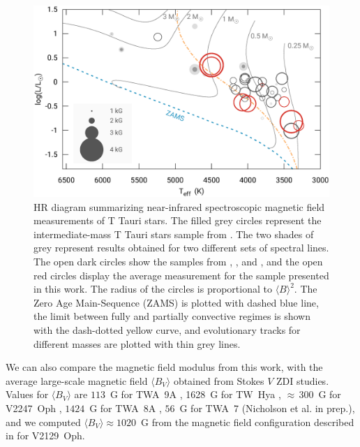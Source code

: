 \documentclass{aa}
\begin{document}
\begin{figure}
\centering
\includegraphics[width=2.0\columnwidth]{yapsi.eps}
\caption{
    HR diagram summarizing near-infrared spectroscopic magnetic field measurements of T Tauri stars. The filled grey circles represent the intermediate-mass T Tauri stars sample from \citet{2017A&A...608A..77L}. The two shades of grey represent results obtained for two different sets of spectral lines. The open dark circles show the samples from \citet{2007ApJ...664..975J}, \citet{2008AJ....136.2286Y}, and \citet{2011ApJ...729...83Y}, and the open red circles display the average measurement for the sample presented in this work. The radius of the circles is proportional to $\langle B \rangle^2$.  The Zero Age Main-Sequence (ZAMS) is plotted with dashed blue line, the limit between fully and partially convective regimes is shown with the dash-dotted yellow curve, and evolutionary tracks for different masses are plotted with thin grey lines.
}
\label{figure:yapsi}
\end{figure}

We can also compare the magnetic field modulus {\bb} from this work, with the average large-scale magnetic field $\langle B_V \rangle$ obtained from Stokes $V$ ZDI studies. Values for $\langle B_V \rangle$ are $113$~G for TWA~9A \citep{2018MNRAS.480.1754N}, 1628~G for TW~Hya \citep{2011donati-twhya}, $\approx$\,300~G for V2247~Oph \citep{2010donati-v2247oph}, $1424$~G for TWA~8A \citep{2019MNRAS.tmp..410H}, $56$~G for TWA~7 (Nicholson et al. in prep.), and we computed $\langle B_V \rangle \approx 1020$~G from the magnetic field configuration described in \citep{2011donati-v2129oph} for V2129~Oph.
\end{document}
